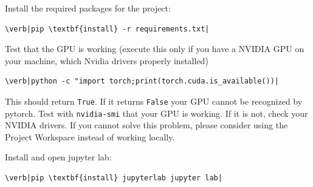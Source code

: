 Install the required packages for the project:

\begin{verbatim}
\verb|pip \textbf{install} -r requirements.txt|
\end{verbatim}

Test that the GPU is working (execute this only if you have a NVIDIA GPU on your machine, which Nvidia drivers properly installed)

\begin{verbatim}
\verb|python -c "import torch;print(torch.cuda.is_available())|
\end{verbatim}

This should return \verb|True|. If it returns \verb|False| your GPU cannot be recognized by pytorch. Test with \verb|nvidia-smi| that your GPU is working. If it is not, check your NVIDIA drivers. If you cannot solve this problem, please consider using the Project Workspace instead of working locally.

Install and open jupyter lab:

\begin{verbatim}
\verb|pip \textbf{install} jupyterlab jupyter lab|
\end{verbatim}
